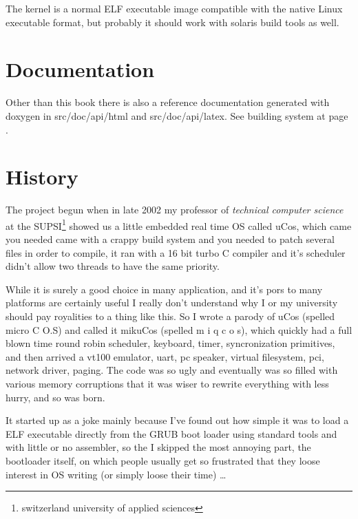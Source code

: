 The kernel is a normal ELF executable image compatible with the native Linux executable
format, but probably it should work with solaris build tools as well.

\section{Documentation}

Other than this book there is also a reference documentation generated with \textsf{doxygen}
in \textsf{src/doc/api/html} and \textsf{src/doc/api/latex}. 
See building system at page \pageref{ch:build}.

\section{History}

The project begun when in late 2002 my professor of 
\emph{technical computer science} at the SUPSI\footnote{switzerland university of applied sciences} showed us a little embedded real time OS called \textsf{uCos\texttrademark}, which came you needed came with a crappy build system and you needed to patch several files in order to compile, it ran with 
a 16 bit turbo C compiler and it's scheduler didn't allow two threads to have the same priority.
 
While it is surely a good choice in many application, and it's pors to many platforms are certainly useful I really don't understand why I or my university should pay royalities to a thing like this.
 So I wrote a parody of uCos (spelled micro C O.S) and called it mikuCos (spelled m i q c o s),
which quickly had a full blown time round robin scheduler, keyboard, timer, syncronization primitives, and then arrived a vt100 emulator, uart, pc speaker, virtual filesystem, pci, network driver, paging.
The code was so ugly and eventually was so filled with various memory corruptions that it was
wiser to rewrite everything with less hurry, and so \acaros was born.

It started up as a joke mainly because I've found out how simple it was to load a ELF executable
directly from the GRUB boot loader using standard tools and with little or no assembler, so
the I skipped the most annoying part, the bootloader itself, on which people usually get so
frustrated that they loose interest in OS writing (or simply loose their time) \ldots